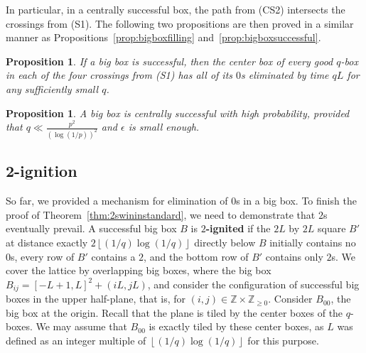 \documentclass{article}
\newcommand{\floor}[1]{\left\lfloor#1\right \rfloor}
\numberwithin{equation}{section}
\newtheorem{prop}[theorem]{Proposition}
\begin{document}
In particular, in a centrally successful box, the path from (CS2) intersects the crossings from (S1). 
The following two propositions are then proved in a similar manner as 
Propositions~\ref{prop:bigboxfilling} and~\ref{prop:bigboxsuccessful}.

\begin{prop}\label{prop:bigboxcenterfilling}
    If a big box is successful, then the center box of every good $q$-box in each of the four crossings from (S1) has all of its $0$s eliminated by time $qL$ for any sufficiently small $q$.
\end{prop}

\begin{prop}\label{prop:bigboxcentrallysuccessful}
    A big box is centrally successful with high probability, provided that $q \ll \frac{p^2}{(\log(1/p))^2}$ and $\epsilon$ is small enough.
\end{prop}



\subsection{2-ignition}

So far, we provided a mechanism for elimination of $0$s 
in a big box. To finish the proof of 
Theorem~\ref{thm:2swininstandard}, we need to demonstrate that $2$s eventually prevail. A successful big box $B$ is \textbf{$2$-ignited} if the $2L$ by $2L$ square $B'$ at distance exactly $2\floor{(1/q)\log(1/q)}$ directly below $B$ initially contains no $0$s, every row of $B'$ contains a $2$, and the bottom row of $B'$ contains only $2$s. 
We cover the lattice by overlapping big boxes, where the big box $B_{ij} = [-L + 1,L]^2 + (iL,jL)$, and consider the configuration of successful big boxes in the upper half-plane, that is, for $(i,j)\in \mathbb{Z} \times \mathbb{Z}_{\ge 0}$. 
Consider $B_{00}$, the big box at the origin.
Recall that the plane is tiled 
by the center boxes of the $q$-boxes. 
We may assume that $B_{00}$ is exactly tiled by these center boxes, as $L$ was defined as an integer multiple of $\floor{(1/q)\log(1/q)}$ for this purpose.
\end{document}

